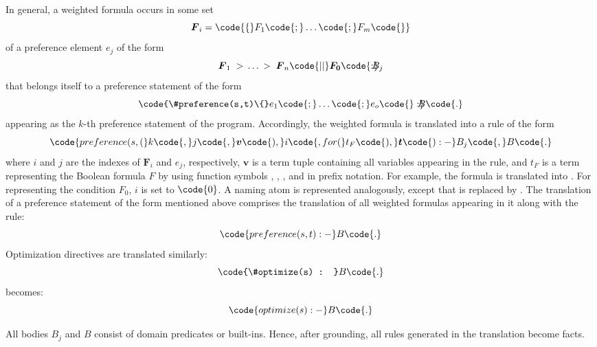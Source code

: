 In general, a weighted formula 
occurs in some set
\[\boldsymbol{F}_i=\code{\{}F_1\code{;}\dots\code{;}F_m\code{\}}\]
of a preference element $e_j$ of the form 
\[\boldsymbol{F}_1\;>\,\dots\,>\;\boldsymbol{F}_n\code{ || }\boldsymbol{F_0}\code{ : }\!\!\!\! B_j\]
that belongs itself to a preference statement  of the form
\[\code{\#preference(s,t)\{}e_1\code{;}\dots\code{;}e_o\code{\} : }\!\!\!\!B\code{.}\]
appearing as the $k$-th preference statement of the program.
Accordingly, the weighted formula is translated into a rule of the form
\[\code{preference(s,(}k\code{,}j\code{,}\boldsymbol{v}\code{),}i\code{,for(}t_F\code{),}\boldsymbol{t}\code{) :- }B_j\code{, }B\code{.}\]
where $i$ and $j$ are the indexes of $\boldsymbol{F}_i$ and $e_j$, respectively, 
$\boldsymbol{v}$ is a term tuple containing all variables appearing in the rule, 
and ${t}_F$ is a term representing the Boolean formula $F$ 
by using function symbols , , , and  in prefix notation.
For example, 
the formula  is translated into . 
%
For representing the condition $F_0$, $i$ is set to $\code{0}$.
%
A naming atom  is represented analogously,
except that  is replaced by .
%
The translation of a preference statement of the form mentioned above 
comprises the translation of all weighted formulas appearing in it
along with the rule:
\[\code{preference(s,t) :- }B\code{.}\]
Optimization directives are translated similarly:
\[\code{\#optimize(s) : }B\code{.}\]
becomes:
\[\code{optimize(s) :- }B\code{.}\]

\begin{note}
All bodies $B_j$ and $B$ consist of domain predicates or built-ins. 
Hence, after grounding, all rules generated in the translation become facts.
\end{note}

